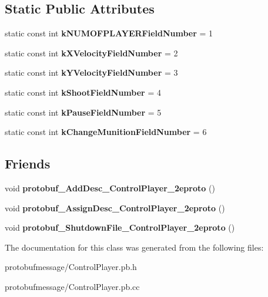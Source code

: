 \subsection*{Static Public Attributes}
\begin{DoxyCompactItemize}
\item 
\hypertarget{class_control_player_aa22557ce6425dad4cb9bbee1c72ea009}{static const int {\bfseries k\-N\-U\-M\-O\-F\-P\-L\-A\-Y\-E\-R\-Field\-Number} = 1}\label{class_control_player_aa22557ce6425dad4cb9bbee1c72ea009}

\item 
\hypertarget{class_control_player_a2848d79ede088ee9d60163a1ce3debb5}{static const int {\bfseries k\-X\-Velocity\-Field\-Number} = 2}\label{class_control_player_a2848d79ede088ee9d60163a1ce3debb5}

\item 
\hypertarget{class_control_player_a23d77701b2b3c5dcac4c23346e3d8008}{static const int {\bfseries k\-Y\-Velocity\-Field\-Number} = 3}\label{class_control_player_a23d77701b2b3c5dcac4c23346e3d8008}

\item 
\hypertarget{class_control_player_a110d46cbecf8ad2123381abec49cd20e}{static const int {\bfseries k\-Shoot\-Field\-Number} = 4}\label{class_control_player_a110d46cbecf8ad2123381abec49cd20e}

\item 
\hypertarget{class_control_player_a5172a9b73b225248c7b0cbc66da6d82a}{static const int {\bfseries k\-Pause\-Field\-Number} = 5}\label{class_control_player_a5172a9b73b225248c7b0cbc66da6d82a}

\item 
\hypertarget{class_control_player_a36f1942f704fa75ce19b13c1d19f9f26}{static const int {\bfseries k\-Change\-Munition\-Field\-Number} = 6}\label{class_control_player_a36f1942f704fa75ce19b13c1d19f9f26}

\end{DoxyCompactItemize}
\subsection*{Friends}
\begin{DoxyCompactItemize}
\item 
\hypertarget{class_control_player_aac621462a97f97bc512d44b05584fdf5}{void {\bfseries protobuf\-\_\-\-Add\-Desc\-\_\-\-Control\-Player\-\_\-2eproto} ()}\label{class_control_player_aac621462a97f97bc512d44b05584fdf5}

\item 
\hypertarget{class_control_player_a21a35d7e412b7505004e6d3230169a28}{void {\bfseries protobuf\-\_\-\-Assign\-Desc\-\_\-\-Control\-Player\-\_\-2eproto} ()}\label{class_control_player_a21a35d7e412b7505004e6d3230169a28}

\item 
\hypertarget{class_control_player_ae1feb442f59225a94fe4948ff34349a6}{void {\bfseries protobuf\-\_\-\-Shutdown\-File\-\_\-\-Control\-Player\-\_\-2eproto} ()}\label{class_control_player_ae1feb442f59225a94fe4948ff34349a6}

\end{DoxyCompactItemize}


The documentation for this class was generated from the following files\-:\begin{DoxyCompactItemize}
\item 
protobufmessage/Control\-Player.\-pb.\-h\item 
protobufmessage/Control\-Player.\-pb.\-cc\end{DoxyCompactItemize}
